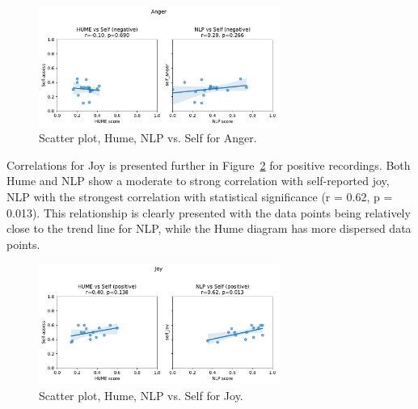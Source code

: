 \begin{figure}[H]
    \centering
    \includegraphics[width=0.7\textwidth]{png/results/rq3/scatter_anger_vs_self_negative.pdf}
    \caption{Scatter plot, Hume, NLP vs. Self for Anger.}
    \label{fig:scatter-anger-rq3-neg}
\end{figure}

Correlations for Joy is presented further in Figure~\ref{fig:scatter-joy-rq3-pos} for positive recordings. Both Hume and NLP show a moderate to strong correlation with self-reported joy, NLP with the strongest correlation with statistical significance (r = 0.62, p = 0.013). This relationship is clearly presented with the data points being relatively close to the trend line for NLP, while the Hume diagram has more dispersed data points. 
\begin{figure}[H]
    \centering
    \includegraphics[width=0.7\textwidth]{png/results/rq3/scatter_joy_vs_self_positive.pdf}
    \caption{Scatter plot, Hume, NLP vs. Self for Joy.}
    \label{fig:scatter-joy-rq3-pos}
\end{figure}

